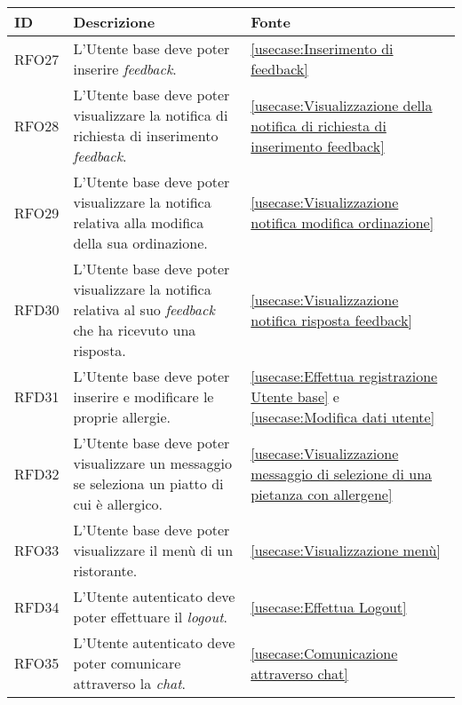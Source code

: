 \begin{table}[H]
	\renewcommand{\arraystretch}{1.5}
	\centering
	\begin{tabularx}{\textwidth}{l|X|p{2cm}}
		\textbf{ID} & \textbf{Descrizione}                                                                                              & \textbf{Fonte}                                                                        \\
		\hline
		RFO27       & L'Utente base deve poter inserire \textit{feedback}.                                                 				& \autoref{usecase:Inserimento di feedback}                                \\
		\hline
		RFO28       & L'Utente base deve poter visualizzare la notifica di richiesta di inserimento \textit{feedback}.                  & \autoref{usecase:Visualizzazione della notifica di richiesta di inserimento feedback} \\
		\hline
		RFO29       & L'Utente base deve poter visualizzare la notifica relativa alla modifica della sua ordinazione.                   & \autoref{usecase:Visualizzazione notifica modifica ordinazione}                       \\
		\hline
		RFD30       & L'Utente base deve poter visualizzare la notifica relativa al suo \textit{feedback} che ha ricevuto una risposta. & \autoref{usecase:Visualizzazione notifica risposta feedback}                          \\
		\hline
		RFD31       & L'Utente base deve poter inserire e modificare le proprie allergie. 												& \autoref{usecase:Effettua registrazione Utente base} e \autoref{usecase:Modifica dati utente}                      \\
		\hline
		RFD32       & L'Utente base deve poter visualizzare un messaggio se seleziona un piatto di cui è allergico. 					& \autoref{usecase:Visualizzazione messaggio di selezione di una pietanza con allergene}                      \\
		\hline
		RFO33       & L'Utente base deve poter visualizzare il menù di un ristorante. 													& \autoref{usecase:Visualizzazione menù}                      \\
		\hline
		RFD34       & L'Utente autenticato deve poter effettuare il \textit{logout}.                                                    & \autoref{usecase:Effettua Logout}                                                     \\
		\hline
		RFO35       & L'Utente autenticato deve poter comunicare attraverso la \textit{chat}.                                           & \autoref{usecase:Comunicazione attraverso chat}                                       \\

\end{tabularx}
\end{table}
